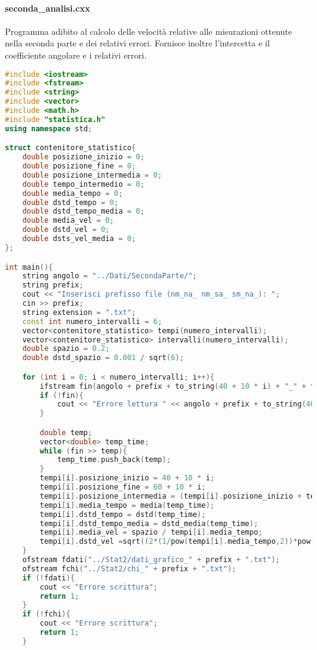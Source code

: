 \documentclass[a4paper,11pt,oneside]{article}
\begin{document}
\paragraph{seconda\_analisi.cxx} Programma adibito al calcolo delle velocità relative alle misurazioni ottenute nella seconda parte e dei relativi errori. Fornisce inoltre l'intercetta e il coefficiente angolare e i relativi errori.  
\begin{lstlisting}[language=C++, label=lst:seconda_analisi.cxx, caption=seconda\_analisi.cxx]
#include <iostream>
#include <fstream>
#include <string>
#include <vector>
#include <math.h>
#include "statistica.h"
using namespace std;

struct contenitore_statistico{
    double posizione_inizio = 0;
    double posizione_fine = 0;
    double posizione_intermedia = 0;
    double tempo_intermedio = 0;
    double media_tempo = 0;
    double dstd_tempo = 0;
    double dstd_tempo_media = 0;
    double media_vel = 0;
    double dstd_vel = 0;
    double dsts_vel_media = 0;
};

int main(){
    string angolo = "../Dati/SecondaParte/";
    string prefix;
    cout << "Inserisci prefisso file (nm_na_ nm_sa_ sm_na_): ";
    cin >> prefix;
    string extension = ".txt";
    const int numero_intervalli = 6;
    vector<contenitore_statistico> tempi(numero_intervalli);
    vector<contenitore_statistico> intervalli(numero_intervalli);
    double spazio = 0.2;
    double dstd_spazio = 0.001 / sqrt(6);

    for (int i = 0; i < numero_intervalli; i++){
        ifstream fin(angolo + prefix + to_string(40 + 10 * i) + "_" + to_string(60 + 10 * i) + extension);
        if (!fin){
            cout << "Errore lettura " << angolo + prefix + to_string(40 + 10 * i) + "_" + to_string(60 + 10 * i) + extension << endl;
        }

        double temp;
        vector<double> temp_time;
        while (fin >> temp){
            temp_time.push_back(temp);
        }
        tempi[i].posizione_inizio = 40 + 10 * i;
        tempi[i].posizione_fine = 60 + 10 * i;
        tempi[i].posizione_intermedia = (tempi[i].posizione_inizio + tempi[i].posizione_fine) / 2;
        tempi[i].media_tempo = media(temp_time);
        tempi[i].dstd_tempo = dstd(temp_time);
        tempi[i].dstd_tempo_media = dstd_media(temp_time);
        tempi[i].media_vel = spazio / tempi[i].media_tempo;
        tempi[i].dstd_vel =sqrt((2*(1/pow(tempi[i].media_tempo,2))*pow(dstd_spazio,2))+(0.2*0.2*(1/pow(tempi[i].media_tempo,4))*(pow(tempi[i].dstd_tempo_media,2))));
    }
    ofstream fdati("../Stat2/dati_grafico_" + prefix + ".txt");
    ofstream fchi("../Stat2/chi_" + prefix + ".txt");
    if (!fdati){
        cout << "Errore scrittura";
        return 1;
    }
    if (!fchi){
        cout << "Errore scrittura";
        return 1;
    }


\end{lstlisting}
\end{document}
